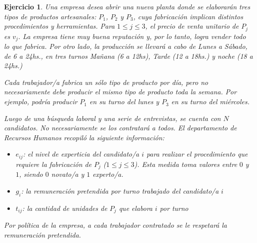 \documentclass[a4paper,oneside,12pt]{amsart}
\newtheorem{quest}{Ejercicio}
\begin{document}

\newpage
\begin{quest}

    Una empresa desea abrir una nueva planta donde se elaborarán tres tipos de productos artesanales: $P_1$, $P_2$ y $P_3$, cuya fabricación implican distintos procedimientos y herramientas. Para $1\leq j\leq 3$, el precio de venta unitario de $P_j$ es $v_j$. La empresa tiene muy buena reputación y, por lo tanto, logra vender todo lo que fabrica. Por otro lado, la producción se llevará a cabo de Lunes a Sábado,  de 6 a 24hs., en tres turnos Mañana (6 a 12hs), Tarde (12 a 18hs.) y noche (18 a 24hs.)

    Cada trabajador/a fabrica un sólo tipo de producto por día, pero no necesariamente debe producir el mismo tipo de producto toda la semana. Por ejemplo, podría producir $P_1$ en su turno del lunes y $P_3$ en su turno del miércoles.
    
    Luego de una búsqueda laboral y una serie de entrevistas, se cuenta con $N$ candidatos. No necesariamente se los contratará a todos. El departamento de Recursos Humanos recopiló la siguiente información:
     \begin{itemize}
         \item $e_{ij}$: el nivel de experticia del candidato/a $i$ para realizar el procedimiento que requiere la fabricación de $P_j$ ($1\leq j\leq3$). Esta medida toma valores entre $0$ y $1$, siendo $0$ novato/a y $1$ experto/a.
         \item $g_i$: la remuneración pretendida por turno trabajado del candidato/a $i$
         \item $t_{ij}$: la cantidad de unidades de $P_j$ que elabora $i$ por turno
     \end{itemize}
    Por política de la empresa, 
    a cada trabajador contratado se le respetará la remuneración pretendida.
    

\end{quest}
\end{document}
